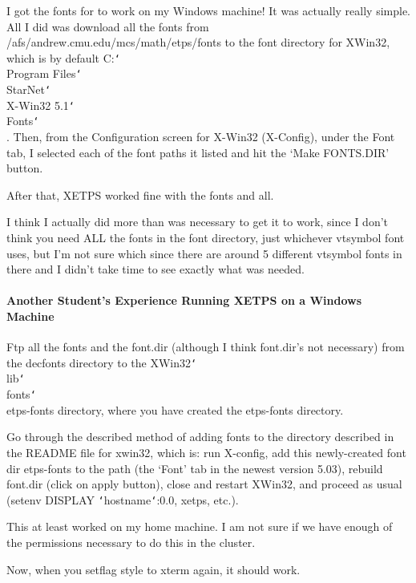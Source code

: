 \documentclass{article}
\begin{document}
I got the fonts for {\ETPS} to work on my Windows machine! It was actually
really simple. All I did was download all the fonts from
/afs/andrew.cmu.edu/mcs/math/etps/fonts to the font directory for XWin32,
which is by default C:{\tt\char`\\}Program Files{\tt\char`\\}StarNet{\tt\char`\\}X-Win32 5.1{\tt\char`\\}Fonts{\tt\char`\\}.
Then, from the Configuration screen for X-Win32 (X-Config), under the Font
tab, I selected each of the font paths it listed and hit the `Make
FONTS.DIR' button.

After that, XETPS worked fine with the fonts and all.

I think I actually did more than was necessary to get it to work,
since I don't think you need ALL the fonts in the {\ETPS} font directory,
just whichever vtsymbol font {\ETPS} uses, but I'm not sure which since
there are around 5 different vtsymbol fonts in there and I didn't take
time to see exactly what was needed.

\paragraph{Another Student's Experience Running XETPS on a Windows Machine}

Ftp all the fonts and the font.dir (although I think font.dir's not
necessary)  from the decfonts directory to the \linebreak
XWin32{\tt\char`\\}lib{\tt\char`\\}fonts{\tt\char`\\}etps-fonts
directory, where you have created the etps-fonts directory.

Go through the described method of adding fonts to the directory
described in the README file for xwin32, which
is:  run X-config, add this newly-created font dir etps-fonts to the path
(the `Font' tab in the newest version 5.03), rebuild font.dir (click on
apply button), close and restart XWin32, and proceed as usual (setenv
DISPLAY {\tt\char`\<}hostname{\tt\char`\>}:0.0, xetps, etc.).

This at least worked on my home machine.  I am not sure if we have
enough of the permissions necessary to do this in the cluster.

Now, when you setflag style to xterm again, it should work.
\end{document}
